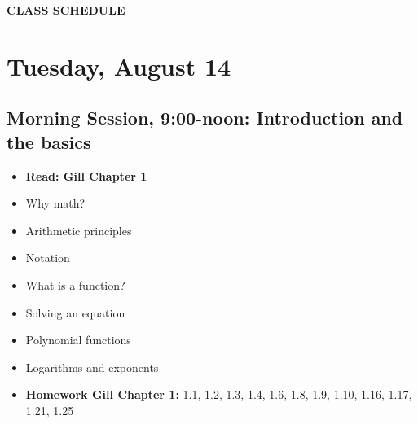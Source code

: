 \documentclass[12pt,a4paper]{article}
\begin{document}



\clearpage
\textbf{CLASS SCHEDULE}\\

\section*{Tuesday, August 14}
\subsection*{Morning Session, 9:00-noon: Introduction and the basics}
\begin{itemize}
\setlength{\itemsep}{0pt}
\footnotesize
\item \textbf{Read: Gill Chapter 1}
\item Why math?
\item Arithmetic principles
\item Notation
\item What is a function?
\item Solving an equation
\item Polynomial functions
\item Logarithms and exponents
\item \textbf{Homework Gill Chapter 1:} 1.1, 1.2, 1.3, 1.4, 1.6, 1.8, 1.9, 1.10, 1.16, 1.17, 1.21, 1.25
\end{itemize}
\end{document}
